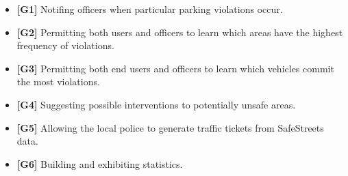\begin{itemize}

\item \textbf{[\hypertarget{G1}{G1}]} Notifing officers when particular parking violations occur.

\item \textbf{[\hypertarget{G2}{G2}]} Permitting both users and officers to learn which areas have the highest frequency of violations.

\item \textbf{[\hypertarget{G3}{G3}]} Permitting both end users and officers to learn which vehicles commit the most violations.

\item \textbf{[\hypertarget{G4}{G4}]} Suggesting possible interventions to potentially unsafe areas.

\item \textbf{[\hypertarget{G5}{G5}]} Allowing the local police to generate traffic tickets from SafeStreets data.

\item \textbf{[\hypertarget{G6}{G6}]} Building and exhibiting statistics.

\end{itemize}